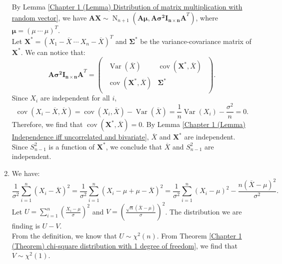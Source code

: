 \documentclass{huhtakm-template-book-v2}
\DeclareMathOperator{\Var}{Var}
\DeclareMathOperator{\cov}{cov}
\DeclareMathOperator{\N}{N}
\begin{document}
\begin{proofing}
\begin{enumerate}
            By Lemma \ref{Chapter 1 (Lemma) Distribution of matrix multiplication with random vector}, we have $\mathbf{AX} \sim \N_{n+1}(\mathbf{A}\boldsymbol{\mu}, \mathbf{A\sigma^{2}I_{n\times n}A}^{T})$, where $\boldsymbol{\mu} = (\mu\ \cdots\ \mu)^{T}$.\\
            Let $\mathbf{X^{*}} = (X_{1} - \overline{X}\ \cdots\ X_{n} - \overline{X})^{T}$ and $\mathbf{\Sigma^{*}}$ be the variance-covariance matrix of $\mathbf{X}^{*}$. We can notice that:
            \begin{equation*}
                \mathbf{A\sigma^{2}I_{n\times n}A}^{T} = \begin{pmatrix}\begin{array}{c|c}
                    \Var(\overline{X}) & \cov(\mathbf{X^{*}}, \overline{X})\\
                    \hline
                    \cov(\mathbf{X^{*}}, \overline{X}) & \mathbf{\Sigma^{*}}
                \end{array}\end{pmatrix}.
            \end{equation*}
            Since $X_{i}$ are independent for all $i$,
            \begin{equation*}
                \cov(X_{i} - \overline{X}, \overline{X}) = \cov(X_{i}, \overline{X}) - \Var(\overline{X}) = \frac{1}{n} \Var(X_{i}) - \frac{\sigma^{2}}{n} = 0.
            \end{equation*}
            Therefore, we find that $\cov(\mathbf{X^{*}}, \overline{X}) = 0$. By Lemma \ref{Chapter 1 (Lemma) Independence iff uncorrelated and bivariate}, $\overline{X}$ and $\mathbf{X^{*}}$ are independent.\\
            Since $S_{n-1}^{2}$ is a function of $\mathbf{X^{*}}$, we conclude that $\overline{X}$ and $S_{n-1}^{2}$ are independent.
            \item We have:
            \begin{equation*}
                \frac{1}{\sigma^{2}} \sum_{i=1}^{n} (X_{i} - \overline{X})^{2} = \frac{1}{\sigma^{2}} \sum_{i=1}^{n} (X_{i} - \mu + \mu - \overline{X})^{2} = \frac{1}{\sigma^{2}} \sum_{i=1}^{n} (X_{i} - \mu)^{2} - \frac{n(\overline{X} - \mu)^{2}}{\sigma^{2}}.
            \end{equation*}
            Let $U = \sum_{i=1}^{n} \left(\frac{X_{i} - \mu}{\sigma}\right)^{2}$ and $V = \left(\frac{\sqrt{n}(\overline{X} - \mu)}{\sigma}\right)^{2}$. The distribution we are finding is $U - V$.\\
            From the definition, we know that $U \sim \chi^{2}(n)$. From Theorem \ref{Chapter 1 (Theorem) chi-square distribution with 1 degree of freedom}, we find that $V \sim \chi^{2}(1)$.\\

\end{enumerate}
\end{proofing}
\end{document}
